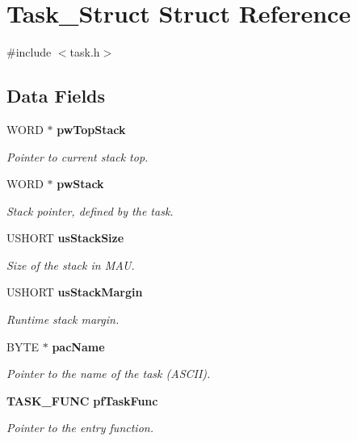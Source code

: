 \section{Task\_\-Struct Struct Reference}
\label{struct_task___struct}


{\ttfamily \#include $<$task.h$>$}\subsection*{Data Fields}
\begin{DoxyCompactItemize}
\item 
WORD $\ast$ {\bf pwTopStack}
\begin{DoxyCompactList}\small\item\em Pointer to current stack top. \item\end{DoxyCompactList}\item 
WORD $\ast$ {\bf pwStack}
\begin{DoxyCompactList}\small\item\em Stack pointer, defined by the task. \item\end{DoxyCompactList}\item 
USHORT {\bf usStackSize}
\begin{DoxyCompactList}\small\item\em Size of the stack in MAU. \item\end{DoxyCompactList}\item 
USHORT {\bf usStackMargin}
\begin{DoxyCompactList}\small\item\em Runtime stack margin. \item\end{DoxyCompactList}\item 
BYTE $\ast$ {\bf pacName}
\begin{DoxyCompactList}\small\item\em Pointer to the name of the task (ASCII). \item\end{DoxyCompactList}\item 
{\bf TASK\_\-FUNC} {\bf pfTaskFunc}
\begin{DoxyCompactList}\small\item\em Pointer to the entry function. \item\end{DoxyCompactList}\item 

\end{DoxyCompactItemize}
